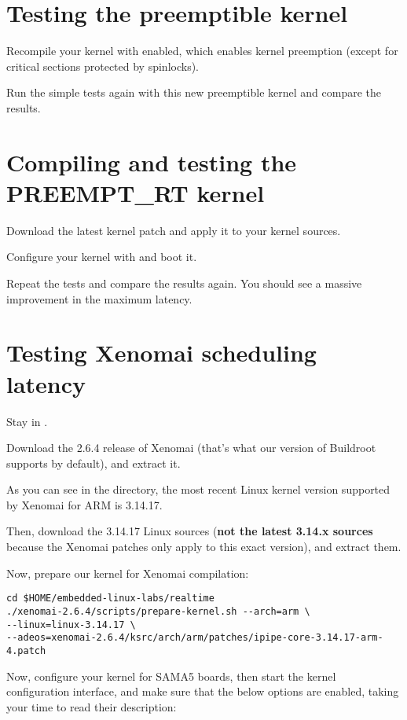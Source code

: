 \section{Testing the preemptible kernel}

Recompile your kernel with  enabled, which
enables kernel preemption (except for critical sections protected by
spinlocks).

Run the simple tests again with this new preemptible kernel and compare
the results.

\section{Compiling and testing the PREEMPT\_RT kernel}

Download the latest  kernel patch and apply it to
your kernel sources.

Configure your kernel with  and boot it.

Repeat the tests and compare the results again. You should see a massive
improvement in the maximum latency.

\section{Testing Xenomai scheduling latency}

Stay in .

Download the 2.6.4 release of Xenomai (that's what our version of
Buildroot supports by default), and extract it.

As you can see in the  directory,
the most recent Linux kernel version supported by Xenomai for ARM is
3.14.17.

Then, download the 3.14.17 Linux sources ({\bf not the latest 3.14.x
sources} because the Xenomai patches only apply to this exact version),
and extract them.
 
Now, prepare our kernel for Xenomai compilation:
\begin{verbatim}
cd $HOME/embedded-linux-labs/realtime
./xenomai-2.6.4/scripts/prepare-kernel.sh --arch=arm \
--linux=linux-3.14.17 \
--adeos=xenomai-2.6.4/ksrc/arch/arm/patches/ipipe-core-3.14.17-arm-4.patch
\end{verbatim}

Now, configure your kernel for SAMA5 boards, then start the kernel
configuration interface, and make sure that the below options are
enabled, taking your time to read their description:

